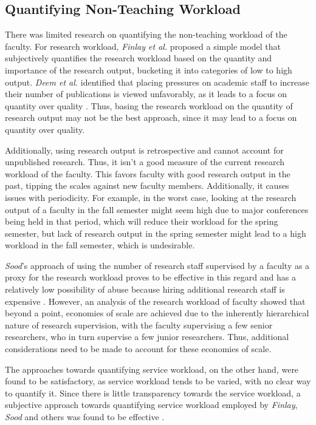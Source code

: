 \subsection{Quantifying Non-Teaching Workload}

There was limited research on quantifying the non-teaching workload of the faculty. For research workload, \textit{Finlay et al.} \cite{finlay1994management} proposed a simple model that subjectively quantifies the research workload based on the quantity and importance of the research output, bucketing it into categories of low to high output. \textit{Deem et al.} identified that placing pressures on academic staff to increase their number of publications is viewed unfavorably, as it leads to a focus on quantity over quality \cite{deem2020new}. Thus, basing the research workload on the quantity of research output may not be the best approach, since it may lead to a focus on quantity over quality.

Additionally, using research output is retrospective and cannot account for unpublished research. Thus, it isn't a good measure of the current research workload of the faculty. This favors faculty with good research output in the past, tipping the scales against new faculty members. Additionally, it causes issues with periodicity. For example, in the worst case, looking at the research output of a faculty in the fall semester might seem high due to major conferences being held in that period, which will reduce their workload for the spring semester, but lack of research output in the spring semester might lead to a high workload in the fall semester, which is undesirable.

\textit{Sood}'s approach of using the number of research staff supervised by a faculty as a proxy for the research workload proves to be effective in this regard and has a relatively low possibility of abuse because hiring additional research staff is expensive \cite{rohan2017}. However, an analysis of the research workload of faculty showed that beyond a point, economies of scale are achieved due to the inherently hierarchical nature of research supervision, with the faculty supervising a few senior researchers, who in turn supervise a few junior researchers. Thus, additional considerations need to be made to account for these economies of scale.

The approaches towards quantifying service workload, on the other hand, were found to be satisfactory, as service workload tends to be varied, with no clear way to quantify it. Since there is little transparency towards the service workload, a subjective approach towards quantifying service workload employed by \textit{Finlay}, \textit{Sood} and others was found to be effective \cite{finlay1994management, rohan2017}.

